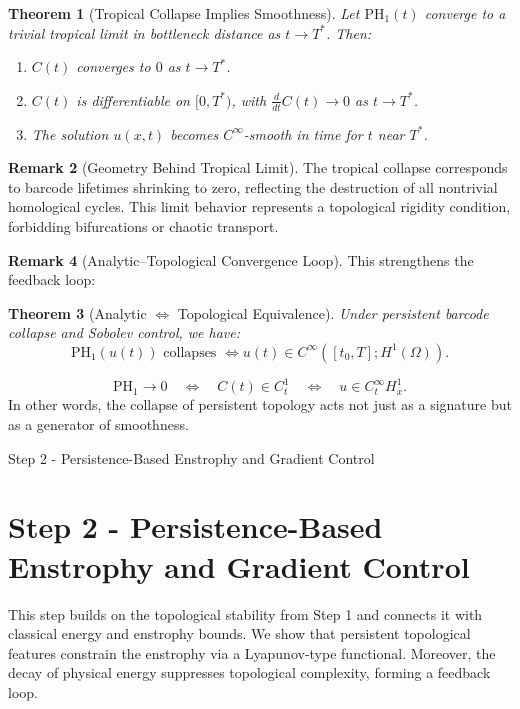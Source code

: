 \documentclass[11pt]{article}
\newtheorem{theorem}{Theorem}[section]
\theoremstyle{definition}
\newtheorem{remark}[theorem]{Remark}
\begin{document}
\begin{theorem}[Tropical Collapse Implies Smoothness]
Let $\mathrm{PH}_1(t)$ converge to a trivial tropical limit in bottleneck distance as $t \to T^*$. Then:
\begin{enumerate}
  \item $C(t)$ converges to $0$ as $t \to T^*$.
  \item $C(t)$ is differentiable on $[0,T^*)$, with $\frac{d}{dt} C(t) \to 0$ as $t \to T^*$.
  \item The solution $u(x,t)$ becomes $C^\infty$-smooth in time for $t$ near $T^*$.
\end{enumerate}
\end{theorem}

\begin{remark}[Geometry Behind Tropical Limit]
The tropical collapse corresponds to barcode lifetimes shrinking to zero, reflecting the destruction of all nontrivial homological cycles. This limit behavior represents a topological rigidity condition, forbidding bifurcations or chaotic transport.
\end{remark}

\begin{remark}[Analytic–Topological Convergence Loop]
This strengthens the feedback loop:

\begin{theorem}[Analytic $\Leftrightarrow$ Topological Equivalence]
Under persistent barcode collapse and Sobolev control, we have:
\[
\mathrm{PH}_1(u(t)) \text{ collapses } \Longleftrightarrow u(t) \in C^\infty([t_0,T]; H^1(\Omega)).
\]
\end{theorem}
\[
\mathrm{PH}_1 \to 0 \quad \Longleftrightarrow \quad C(t) \in C^1_t \quad \Longleftrightarrow \quad u \in C^\infty_t H^1_x.
\]
In other words, the collapse of persistent topology acts not just as a signature but as a generator of smoothness.
\end{remark}



Step 2 - Persistence-Based Enstrophy and Gradient Control
\section{Step 2 - Persistence-Based Enstrophy and Gradient Control}

This step builds on the topological stability from Step 1 and connects it with classical energy and enstrophy bounds. We show that persistent topological features constrain the enstrophy via a Lyapunov-type functional. Moreover, the decay of physical energy suppresses topological complexity, forming a feedback loop.
\end{document}
